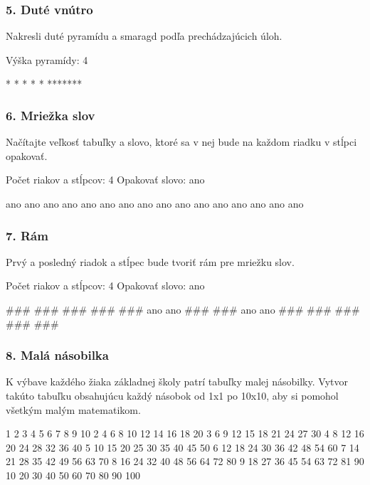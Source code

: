 \subsubsection*{5. Duté vnútro}
Nakresli duté pyramídu a smaragd podľa prechádzajúcich úloh.

\begin{code}
Výška pyramídy: 4

    *
   * *
  *   *
 *******
\end{code}


\subsubsection*{6. Mriežka slov}
Načítajte veľkosť tabuľky a slovo, ktoré sa v nej bude na každom riadku v stĺpci opakovať.

\begin{code}
Počet riakov a stĺpcov: 4
Opakovať slovo: ano

ano ano ano ano
ano ano ano ano
ano ano ano ano
ano ano ano ano
\end{code}



\subsubsection*{7. Rám}
Prvý a posledný riadok a stĺpec bude tvoriť rám pre mriežku slov.

\begin{code}
Počet riakov a stĺpcov: 4
Opakovať slovo: ano

### ### ### ###
### ano ano ###
### ano ano ###
### ### ### ###
\end{code}


\subsubsection*{8. Malá násobilka}
K výbave každého žiaka základnej školy patrí tabuľky malej násobilky. Vytvor takúto tabuľku obsahujúcu každý násobok od 1x1 po 10x10, aby si pomohol všetkým malým matematikom.

\begin{code}
   1   2   3   4   5   6   7   8   9  10
   2   4   6   8  10  12  14  16  18  20
   3   6   9  12  15  18  21  24  27  30
   4   8  12  16  20  24  28  32  36  40
   5  10  15  20  25  30  35  40  45  50
   6  12  18  24  30  36  42  48  54  60
   7  14  21  28  35  42  49  56  63  70
   8  16  24  32  40  48  56  64  72  80
   9  18  27  36  45  54  63  72  81  90
   10  20  30  40  50  60  70  80  90 100
\end{code}


